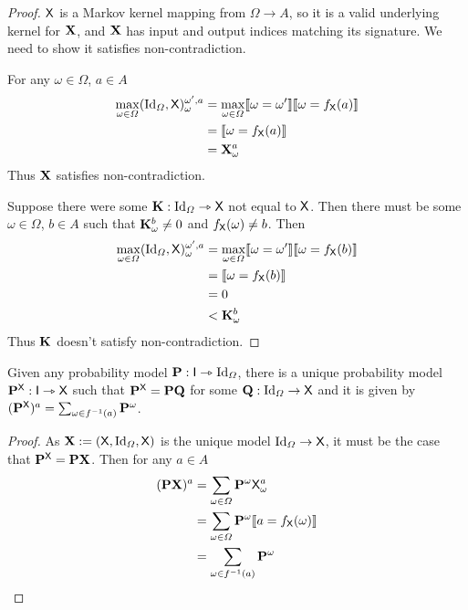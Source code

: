 \begin{proof}
$\mathsf{X}$ is a Markov kernel mapping from $\Omega\to A$, so it is a valid underlying kernel for $\mathbf{X}$, and $\mathbf{X}$ has input and output indices matching its signature. We need to show it satisfies non-contradiction.

For any $\omega\in \Omega$, $a\in A$
\begin{align}
	\max_{\omega\in \Omega}(\text{Id}_\Omega,\mathsf{X})_{\omega}^{\omega',a} &= \max_{\omega\in \Omega} \llbracket \omega = \omega' \rrbracket \llbracket \omega = f_{\mathsf{X}}(a) \rrbracket\\
	&= \llbracket \omega = f_{\mathsf{X}}(a) \rrbracket\\
	&= \mathbf{X}_\omega^a
\end{align}
Thus $\mathbf{X}$ satisfies non-contradiction.

Suppose there were some $\mathbf{K}:\text{Id}_\Omega\rightarrowtriangle \mathsf{X}$ not equal to $\mathsf{X}$. Then there must be some $\omega\in \Omega$, $b\in A$ such that $\mathbf{K}_\omega^b\neq 0$ and $f_{\mathsf{X}}(\omega)\neq b$. Then
\begin{align}
	\max_{\omega\in \Omega}(\text{Id}_\Omega,\mathsf{X})_{\omega}^{\omega',a} &= \max_{\omega\in \Omega} \llbracket \omega = \omega' \rrbracket \llbracket \omega = f_{\mathsf{X}}(b) \rrbracket\\
	&= \llbracket \omega = f_{\mathsf{X}}(b) \rrbracket\\
	&= 0\\
	&< \mathbf{K}_\omega^b
\end{align}
Thus $\mathbf{K}$ doesn't satisfy non-contradiction.
\end{proof}

\begin{corollary}\label{corr:pushforward}
Given any probability model $\mathbf{P}:\mathsf{I}\rightarrowtriangle \text{Id}_\Omega$, there is a unique probability model $\mathbf{P}^{\mathsf{X}}:\mathsf{I}\rightarrowtriangle \mathsf{X}$ such that $\mathbf{P}^{\mathsf{X}}=\mathbf{P}\mathbf{Q}$ for some $\mathbf{Q}:\text{Id}_\Omega\to \mathsf{X}$ and it is given by $(\mathbf{P}^{\mathsf{X}})^a = \sum_{\omega\in f^{-1}(a)} \mathbf{P}^{\omega}$.
\end{corollary}

\begin{proof}
As $\mathbf{X}:=(\mathsf{X},\text{Id}_\Omega,\mathsf{X})$ is the unique model $\text{Id}_\Omega\to \mathsf{X}$, it must be the case that $\mathbf{P}^{\mathsf{X}}=\mathbf{P}\mathbf{X}$. Then for any $a\in A$
\begin{align}
	(\mathbf{P}\mathbf{X})^a &= \sum_{\omega\in \Omega} \mathbf{P}^\omega\mathsf{X}_\omega^a\\
						 &= \sum_{\omega\in \Omega} \mathbf{P}^\omega \llbracket a = f_{\mathsf{X}}(\omega) \rrbracket\\
						 &= \sum_{\omega\in f^{-1}(a)} \mathbf{P}^{\omega}
\end{align}
\end{proof}


